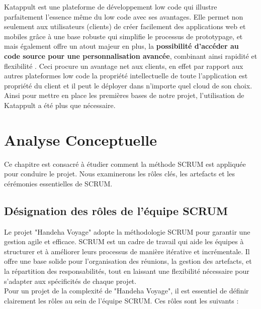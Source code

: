 \documentclass[12pt]{report}
\begin{document}
				Katappult est une plateforme de développement low code qui illustre parfaitement l’essence même du low code avec ses avantages. Elle permet non seulement aux utilisateurs (clients) de créer facilement des applications web et mobiles grâce à une base robuste qui simplifie le processus de prototypage, et mais également offre un atout majeur en plus, la \textbf{possibilité d'accéder au code source pour une personnalisation avancée}, combinant ainsi rapidité et flexibilité \cite{katappult}. Ceci procure un avantage net aux clients, en effet par rapport aux autres plateformes low code la propriété intellectuelle de toute l’application est propriété du client et il peut le déployer dans n’importe quel cloud de son choix.\\

				Ainsi pour mettre en place les premières bases de notre projet, l’utilisation de Katappult a été plus que nécessaire.




				\chapter{Analyse Conceptuelle}

				\hspace{15pt}Ce chapitre est consacré à étudier comment la méthode SCRUM est appliquée pour conduire le projet. Nous examinerons les rôles clés, les artefacts et les cérémonies essentielles de SCRUM.

				\section{Désignation des rôles de l’équipe SCRUM}

				\hspace{15pt} Le projet "Handeha Voyage" adopte la méthodologie SCRUM pour garantir une gestion agile et efficace. SCRUM est un cadre de travail qui aide les équipes à structurer et à améliorer leurs processus de manière itérative et incrémentale. Il offre une base solide pour l'organisation des réunions, la gestion des artefacts, et la répartition des responsabilités, tout en laissant une flexibilité nécessaire pour s'adapter aux spécificités de chaque projet.\\

				Pour un projet de la complexité de "Handeha Voyage", il est essentiel de définir clairement les rôles au sein de l'équipe SCRUM. Ces rôles sont les suivants :
\end{document}
